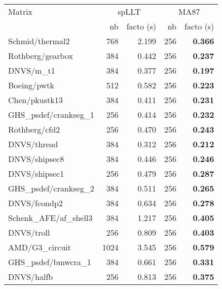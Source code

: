 \begin{tabular}{l|rr|rr}
  \hline
  Matrix                          & \multicolumn{2}{c}{spLLT} & \multicolumn{2}{c}{MA87}     \\
  \cline{2-5}
                                  & nb                        & facto (s) & nb  & facto (s)  \\
  \hline
  Schmid/thermal2                 & 768                       & 2.199     & 256 & \bf 0.366  \\
  Rothberg/gearbox                & 384                       & 0.442     & 256 & \bf 0.237  \\
  DNVS/m\_t1                      & 384                       & 0.377     & 256 & \bf 0.197  \\
  Boeing/pwtk                     & 512                       & 0.582     & 256 & \bf 0.223  \\
  Chen/pkustk13                   & 384                       & 0.411     & 256 & \bf 0.231  \\
  GHS\_psdef/crankseg\_1          & 256                       & 0.414     & 256 & \bf 0.232  \\
  Rothberg/cfd2                   & 256                       & 0.470     & 256 & \bf 0.243  \\
  DNVS/thread                     & 384                       & 0.312     & 256 & \bf 0.212  \\
  DNVS/shipsec8                   & 384                       & 0.446     & 256 & \bf 0.246  \\
  DNVS/shipsec1                   & 256                       & 0.479     & 256 & \bf 0.287  \\
  GHS\_psdef/crankseg\_2          & 384                       & 0.511     & 256 & \bf 0.265  \\
  DNVS/fcondp2                    & 384                       & 0.634     & 256 & \bf 0.278  \\
  Schenk\_AFE/af\_shell3          & 384                       & 1.217     & 256 & \bf 0.405  \\
  DNVS/troll                      & 256                       & 0.809     & 256 & \bf 0.403  \\
  AMD/G3\_circuit                 & 1024                      & 3.545     & 256 & \bf 0.579  \\
  GHS\_psdef/bmwcra\_1            & 384                       & 0.661     & 256 & \bf 0.331  \\
  DNVS/halfb                      & 256                       & 0.813     & 256 & \bf 0.375  \\

\end{tabular}
